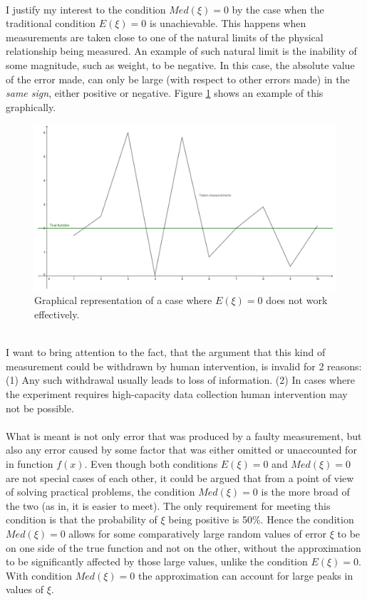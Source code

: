 \\
I justify my interest to the condition $Med(\xi)=0$ by the case when the traditional condition $E(\xi)=0$ is unachievable. This happens when measurements are taken close to one of the natural limits of the physical relationship being measured. An example of such natural limit is the inability of some magnitude, such as weight, to be negative. In this case, the absolute value of the error made, can only be large (with respect to other errors made) in the \textit{same sign}, either positive or negative. Figure \ref{fig:graph-nl} shows an example of this graphically.
\begin{figure}[h!]
\includegraphics[scale=0.1]{pic-naturallimits}
\centering
\caption{Graphical representation of a case where $E(\xi)=0$ does not work effectively.}
\label{fig:graph-nl}
\end{figure}
\\
I want to bring attention to the fact, that the argument that this kind of measurement could be withdrawn by human intervention, is invalid for 2 reasons: (1) Any such withdrawal usually leads to loss of information. (2) In cases where the experiment requires high-capacity data collection human intervention may not be possible.\\
\\
What is meant is not only error that was produced by a faulty measurement, but also any error caused by some factor that was either omitted or unaccounted for in function $f(x)$. Even though both conditions $E(\xi)=0$ and $Med(\xi)=0$ are not special cases of each other, it could be argued that from a point of view of solving practical problems, the condition $Med(\xi)=0$ is the more broad of the two (as in, it is easier to meet). The only requirement for meeting this condition is that the probability of $\xi$ being positive is 50\%.  Hence the condition $Med(\xi)=0$ allows for some comparatively large random values of error $\xi$ to be on one side of the true function and not on the other, without the approximation to be significantly affected by those large values, unlike the condition $E(\xi)=0$. With condition $Med(\xi)=0$ the approximation can account for large peaks in values of $\xi$.\\
